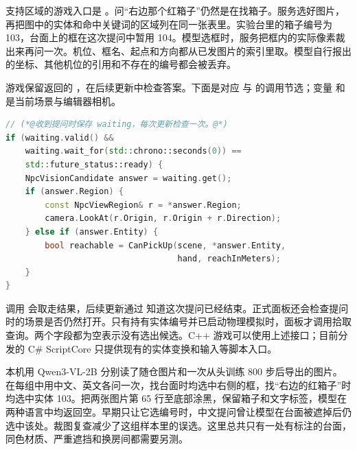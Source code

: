支持区域的游戏入口是 。问“右边那个红箱子”仍然是在找箱子。服务选好图片，再把图中的实体和命中关键词的区域列在同一张表里。实验台里的箱子编号为 103，台面上的框在这次提问中暂用 104。模型选框时，服务把框内的实际像素裁出来再问一次。机位、框名、起点和方向都从已发图片的索引里取。模型自行报出的坐标、其他机位的引用和不存在的编号都会被丢弃。

游戏保留返回的 ，在后续更新中检查答案。下面是对应  与  的调用节选；变量  和  是当前场景与编辑器相机。

\begin{lstlisting}[language=C++]
// (*@收到提问时保存 waiting，每次更新检查一次。@*)
if (waiting.valid() &&
    waiting.wait_for(std::chrono::seconds(0)) ==
    std::future_status::ready) {
    NpcVisionCandidate answer = waiting.get();
    if (answer.Region) {
        const NpcViewRegion& r = *answer.Region;
        camera.LookAt(r.Origin, r.Origin + r.Direction);
    } else if (answer.Entity) {
        bool reachable = CanPickUp(scene, *answer.Entity,
                                   hand, reachInMeters);
    }
}
\end{lstlisting}

调用  会取走结果，后续更新通过  知道这次提问已经结束。正式面板还会检查提问时的场景是否仍然打开。只有持有实体编号并已启动物理模拟时，面板才调用拾取查询。两个字段都为空表示没有选出候选。C++ 游戏可以使用上述接口；目前分发的 C\# ScriptCore 只提供现有的实体变换和输入等脚本入口。

本机用 Qwen3-VL-2B 分别读了随仓图片和一次从头训练 800 步后导出的图片。在每组中用中文、英文各问一次，找台面时均选中右侧的框，找“右边的红箱子”时均选中实体 103。把两张图片第 65 行至底部涂黑，保留箱子和文字标签，模型在两种语言中均返回空。早期只让它选编号时，中文提问曾让模型在台面被遮掉后仍选中该处。裁图复查减少了这组样本里的误选。这里总共只有一处有标注的台面，同色材质、严重遮挡和换房间都需要另测。

